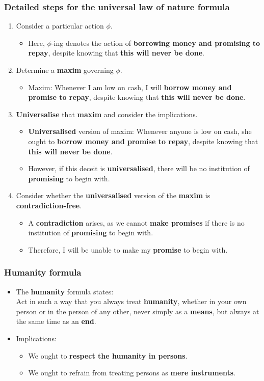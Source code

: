 \documentclass[11pt]{article}
\begin{document}
\subsubsection{Detailed steps for the universal law of nature formula}
\label{sec:org01af94b}
\begin{enumerate}
\item Consider a particular action \(\phi\).
\begin{itemize}
\item Here, \(\phi\)-ing denotes the action of \textbf{borrowing money and promising to repay}, despite knowing that \textbf{this will never be done}.
\end{itemize}
\item Determine a \textbf{maxim} governing \(\phi\).
\begin{itemize}
\item Maxim: Whenever I am low on cash, I will \textbf{borrow money and promise to repay}, despite knowing that \textbf{this will never be done}.
\end{itemize}
\item \textbf{Universalise} that \textbf{maxim} and consider the implications.
\begin{itemize}
\item \textbf{Universalised} version of maxim: Whenever anyone is low on cash, she ought to \textbf{borrow money and promise to repay}, despite knowing that \textbf{this will never be done}.
\item However, if this deceit is \textbf{universalised}, there will be no institution of \textbf{promising} to begin with.
\end{itemize}
\item Consider whether the \textbf{universalised} version of the \textbf{maxim} is \textbf{contradiction-free}.
\begin{itemize}
\item A \textbf{contradiction} arises, as we cannot \textbf{make promises} if there is no institution of \textbf{promising} to begin with.
\item Therefore, I will be unable to make my \textbf{promise} to begin with.
\end{itemize}
\end{enumerate}
\subsubsection{Humanity formula}
\label{sec:org6827ba7}
\begin{itemize}
\item The \textbf{humanity} formula states:  \\
Act in such a way that you always treat \textbf{humanity}, whether in your own person or in the person of any other, never simply as a \textbf{means}, but always at the same time as an \textbf{end}.
\item Implications:
\begin{itemize}
\item We ought to \textbf{respect the humanity in persons}.
\item We ought to refrain from treating persons as \textbf{mere instruments}.
\end{itemize}
\end{itemize}
\end{document}
